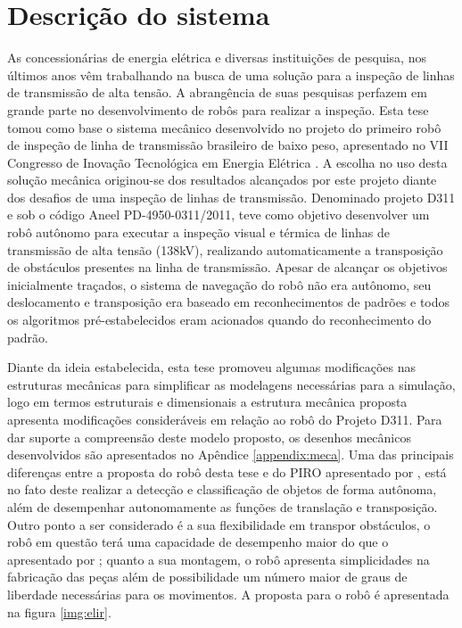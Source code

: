 \section{Descrição do sistema}
\label{sec:desc}

As concessionárias de energia elétrica e diversas instituições de pesquisa, nos últimos anos vêm trabalhando na busca de uma solução para a inspeção de linhas de transmissão de alta tensão. A abrangência de suas pesquisas perfazem em grande parte no desenvolvimento de robôs para realizar a inspeção. 
Esta tese tomou como base o sistema mecânico desenvolvido no projeto do primeiro robô de inspeção de linha de transmissão brasileiro de baixo peso, apresentado no VII Congresso de Inovação Tecnológica em Energia Elétrica \cite{mourao2015robolinhas}.
A escolha no uso desta solução mecânica originou-se dos resultados alcançados por este projeto diante dos desafios de uma inspeção de linhas de transmissão. Denominado projeto D311 e sob o código Aneel PD-4950-0311/2011, teve como objetivo desenvolver um robô autônomo para executar a inspeção visual e térmica de linhas de transmissão de alta tensão (138kV), realizando automaticamente a transposição de obstáculos presentes na linha de transmissão.
Apesar de alcançar os objetivos inicialmente traçados, o sistema de navegação do robô não era autônomo, seu deslocamento e transposição era baseado em reconhecimentos de padrões e todos os algoritmos pré-estabelecidos eram acionados quando do reconhecimento do padrão.

Diante da ideia estabelecida, esta tese promoveu algumas modificações nas estruturas mecânicas para simplificar as modelagens necessárias para a simulação, logo em termos estruturais e dimensionais a estrutura mecânica proposta apresenta modificações consideráveis em relação ao robô do Projeto D311. Para dar suporte a compreensão deste modelo proposto, os desenhos mecânicos desenvolvidos são apresentados no Apêndice \ref{appendix:meca}. Uma das principais diferenças entre a proposta do robô desta tese e do PIRO apresentado por , está no fato deste realizar a detecção e classificação de objetos de forma autônoma, além de desempenhar autonomamente as funções de translação e transposição. Outro ponto a ser considerado é a sua flexibilidade em transpor obstáculos, o robô em questão terá uma capacidade de desempenho maior do que o apresentado por \cite{mourao2015robolinhas}; quanto a sua montagem, o robô apresenta simplicidades na fabricação das peças além de possibilidade um número maior de graus de liberdade necessárias para os movimentos. A proposta para o robô é apresentada na figura \ref{img:elir}.

